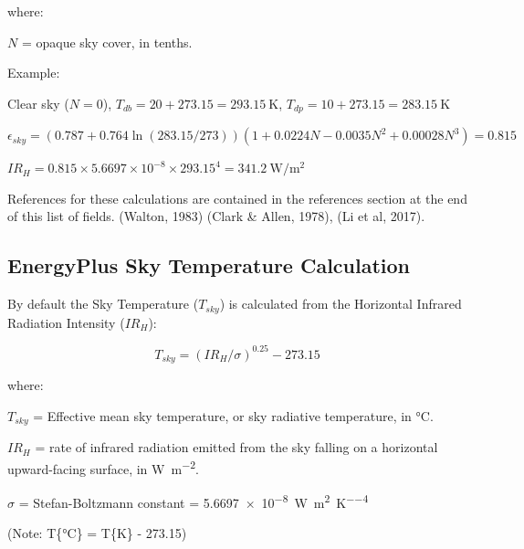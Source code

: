\noindent where:
\newline

$N$ = opaque sky cover, in tenths.
\newline

\noindent Example:
\newline

Clear sky ($N=0$), $T_{db} = 20 + 273.15 = \SI{293.15}{\kelvin}$, $T_{dp} = 10 + 273.15 = \SI{283.15}{\kelvin}$
\newline

$\epsilon_{sky} = \left(0.787 + 0.764  \ln\left(283.15/273\right)\right)  \left(1 + 0.0224  N - 0.0035  N^2 + 0.00028  N^3 \right) = 0.815$
\newline

$IR_H = 0.815 \times 5.6697 \times 10^{-8} \times 293.15^{4} = \SI{341.2}{\watt\per\meter\squared}$
\newline

References for these calculations are contained in the references section at the end of this list of fields. (Walton, 1983) (Clark \& Allen, 1978), (Li et al, 2017).

\subsection{EnergyPlus Sky Temperature Calculation}\label{energyplus-sky-temperature-calculation}

By default the Sky Temperature ($T_{sky}$) is calculated from the Horizontal Infrared Radiation Intensity ($IR_H$):

\begin{equation}
T_{sky} = \left(IR_H / \sigma\right)^{0.25} - 273.15
\end{equation}

\noindent where:
\newline

$T_{sky}$ = Effective mean sky temperature, or sky radiative temperature, in \si{\celsius}.
\newline

$IR_H$ = rate of infrared radiation emitted from the sky falling on a horizontal upward-facing surface, in \si{\watt\per\meter\squared}.
\newline

$\sigma$ = Stefan-Boltzmann constant = \SI{5.6697e-8}{\watt\per\meter\squared\per\kelvin\tothe{4}}
\newline

(Note: T\{\si{\celsius}\} = T\{\si{\kelvin}\} - 273.15)
\newline

